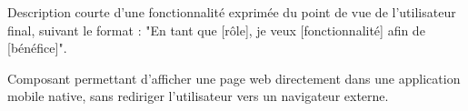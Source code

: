 \begin{description}[leftmargin=4cm, labelwidth=3.5cm]
    \vspace{0.3cm}

    \item[\textbf{User Story}] Description courte d'une fonctionnalité 
    exprimée du point de vue de l'utilisateur final, suivant le 
    format : "En tant que [rôle], je veux [fonctionnalité] afin 
    de [bénéfice]".

    \vspace{0.3cm}

    \item[\textbf{WebView}] Composant permettant d'afficher une 
    page web directement dans une application mobile native, sans 
    rediriger l'utilisateur vers un navigateur externe.

\end{description}